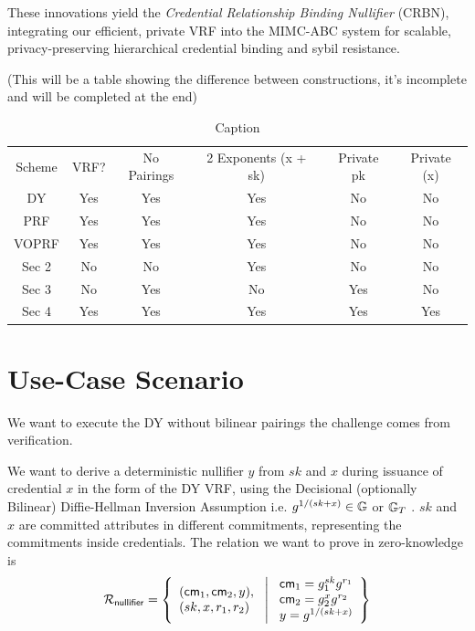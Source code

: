 These innovations yield the \emph{Credential Relationship Binding Nullifier} (CRBN), integrating our efficient, private VRF into the MIMC-ABC system for scalable, privacy-preserving hierarchical credential binding and sybil resistance.

(This will be a table showing the difference between constructions, it's incomplete and will be completed at the end)
\begin{table}
    \centering
    \begin{tabular}{cccccc}
       Scheme  & VRF?     & No Pairings  & 2 Exponents (x + sk)  & Private pk & Private (x) \\
       DY      & Yes     & Yes           & Yes                   & No         & No \\
       PRF      & Yes     & Yes           & Yes                   & No         & No \\
       VOPRF      & Yes     & Yes           & Yes                   & No         & No \\
       Sec 2   & No     & No            & Yes                   & No         & No \\
       Sec 3   & No     & Yes           & No                    & Yes        & No \\
       Sec 4   & Yes     & Yes           & Yes                   & Yes        & Yes\\
    \end{tabular}
    \caption{Caption}
    \label{tab:my_label}
\end{table}





\section{Use-Case Scenario}
We want to execute the DY without bilinear pairings the challenge comes from verification. 





We want to derive a deterministic nullifier $y$ from $sk$ and $x$ during issuance of credential $x$ in the form of the DY VRF, using the Decisional (optionally Bilinear) Diffie-Hellman Inversion Assumption i.e. $g^{1/(sk + x)} \in \mathbb{G}$ or $\mathbb{G}_T$ . $sk$ and $x$ are committed attributes in different commitments, representing the commitments inside credentials. The relation we want to prove in zero-knowledge is
\[
\mathcal{R}_{\mathsf{nullifier}} = \left\{ 
\begin{array}{l} (\mathsf{cm}_1, \mathsf{cm}_2, y),\\
(sk, x, r_1, r_2) 
\end{array}
\ \middle|
\ \begin{array}{l}
\mathsf{cm}_1 = g_1^{sk} g^{r_1} \\
\mathsf{cm}_2 = g_2^{x} g^{r_2} \\
y = g^{1/(sk + x)} \\
\end{array} \right\}
\]

